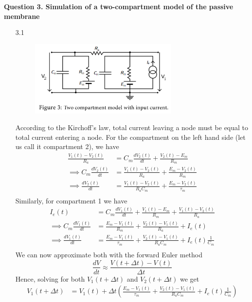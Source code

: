 \documentclass[12pt]{article}
\begin{document}
\noindent\textbf{Question 3. Simulation of a two-compartment model of the passive membrane}
\begin{enumerate}
\item[3.1]
\begin{figure}[h]
    \centering
    \includegraphics[width=0.7\textwidth]{circuit.png}
\end{figure}
According to the Kirchoff's law, total current leaving a node must be equal to total current entering a node. For the compartment 
on the left hand side (let us call it compartment 2), we have 
\begin{align*}
    \frac{V_{1}(t) - V_{2}(t)}{R_{a}} &= C_{m}\frac{dV_{2}(t)}{dt} + \frac{V_{2}(t)-E_{m}}{R_m}\\
    \implies C_{m}\frac{dV_{2}(t)}{dt} &= \frac{V_{1}(t) - V_{2}(t)}{R_{a}} + \frac{E_{m} - V_{2}(t)}{R_m}\\
    \implies \frac{dV_{2}(t)}{dt} &= \frac{V_{1}(t) - V_{2}(t)}{R_{a}C_{m}} + \frac{E_{m} - V_{2}(t)}{\tau_{m}}\\
\end{align*}
Similarly, for compartment 1 we have
\begin{align*}
    I_{e}(t) &= C_{m}\frac{dV_{1}(t)}{dt} + \frac{V_{1}(t)-E_{m}}{R_m} + \frac{V_{1}(t) - V_{2}(t)}{R_{a}}\\
    \implies C_{m}\frac{dV_{1}(t)}{dt} &= \frac{E_{m} - V_{1}(t)}{R_m} + \frac{V_{2}(t) - V_{1}(t)}{R_{a}} + I_{e}(t)\\
    \implies \frac{dV_{1}(t)}{dt} &= \frac{E_{m} - V_{1}(t)}{\tau_{m}} + \frac{V_{2}(t) - V_{1}(t)}{R_{a}C_{m}} + I_{e}(t)\frac{1}{C_{m}}\\
\end{align*}
We can now approximate both with the forward Euler method 
$$\frac{dV}{dt} \approx \frac{V(t+\Delta t)-V(t)}{\Delta t}$$
Hence, solving for both $V_{1}(t + \Delta t)$ and $V_{2}(t + \Delta t)$ we get
\begin{align*}
    V_{1}(t+\Delta t) &=  V_{1}(t) + \Delta t\left(\frac{E_{m} - V_{1}(t)}{\tau_{m}} + \frac{V_{2}(t) - V_{1}(t)}{R_{a}C_{m}} + I_{e}(t)\frac{1}{C_{m}}\right)\\

\end{align*}
\end{enumerate}
\end{document}
